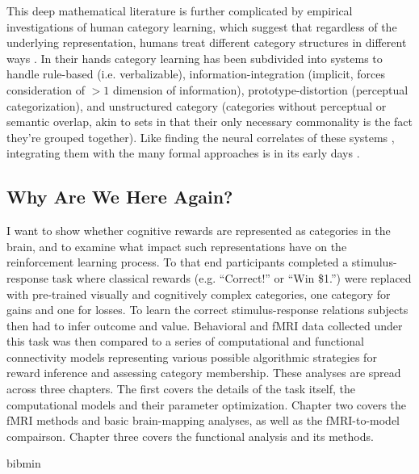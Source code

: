 \documentclass[doc,12pt]{apa}        %
\begin{document}
This deep mathematical literature is further complicated by empirical investigations of human category learning, which suggest that regardless of the underlying representation, humans treat different category structures in different ways \cite{Ashby:2011p9148}.  In their hands category learning has been subdivided
into systems to handle rule-based (i.e. verbalizable), information-integration (implicit, forces consideration of $>1$ dimension of information), prototype-distortion (perceptual categorization), and unstructured category (categories without perceptual or semantic overlap, akin to sets in that their only necessary commonality is the fact they're grouped together).  Like finding the neural correlates of these systems \cite{Ashby:2005p9152,Ashby:2006p9153}, integrating them with the many formal approaches is in its early days \cite{Ashby:2011p9148}.

\subsection{Why Are We Here Again?}
\label{sub:goals}
I want to show whether cognitive rewards are represented as categories in the brain, and to examine what impact such representations have on the reinforcement learning process.  To that end participants completed a stimulus-response task where classical rewards (e.g. ``Correct!'' or ``Win \$1.'') were replaced with pre-trained visually and cognitively complex categories, one category for gains and one for losses.  To learn the correct stimulus-response relations subjects then had to infer outcome and value.   Behavioral and fMRI data collected under this task was then compared to a series of computational and functional connectivity models representing various possible algorithmic strategies for reward inference and assessing category membership.  These analyses are spread across three chapters.  The first covers the details of the task itself, the computational models and their parameter optimization.  Chapter two covers the fMRI methods and basic brain-mapping analyses, as well as the fMRI-to-model compairson.  Chapter three covers the functional analysis and its methods.

\newpage
 {bibmin}
\end{document}
